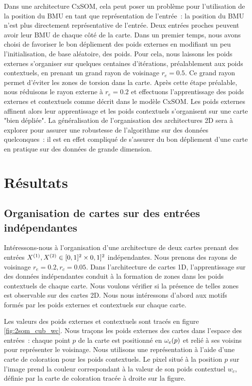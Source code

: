 \documentclass[../main]{subfiles}
\begin{document}
Dans une architecture CxSOM, cela peut poser un problème pour l'utilisation de la position du BMU en tant que représentation de l'entrée~: la position du BMU n'est plus directement représentative de l'entrée.  Deux entrées proches peuvent avoir leur BMU de chaque côté de la carte.
Dans un premier temps, nous avons choisi de favoriser le bon dépliement des poids externes en modifiant un peu l'initialisation, de base aléatoire, des poids. Pour cela, nous laissons les poids externes s'organiser sur quelques centaines d'itérations, préalablement aux poids contextuels, en prenant un grand rayon de voisinage $r_e = 0.5$. 
Ce grand rayon permet d'éviter les zones de torsion dans la carte. Après cette étape préalable, nous réduisons le rayon externe  à $r_e = 0.2$ et effectuons l'apprentissage des poids externes et contextuels comme décrit dans le modèle CxSOM. Les poids externes affinent alors leur apprentissage et les poids contextuels s'organisent sur une carte "bien dépliée". 
La généralisation de l'organisation des architectures 2D sera à explorer pour assurer une robustesse de l'algorithme sur des données quelconques~: il est en effet compliqué de s'assurer du bon dépliement d'une carte en pratique sur des données de grande dimension.


\section{Résultats}


\subsection{Organisation de cartes sur des entrées indépendantes}

Intéressons-nous à l'organisation d'une architecture de deux cartes prenant des entrées $X^{({1})}, X^{({2})} \in [0,1]^2 \times 0,1]^2$ indépendantes. Nous prenons des rayons de voisinage $r_e = 0.2, r_c = 0.05$.
Dans l'architecture de cartes 1D, l'apprentissage sur des données indépendantes conduit à la formation de zones dans les poids contextuels de chaque carte. Nous voulons vérifier si la présence de telles zones est observable sur des cartes 2D.
Nous nous intéressons d'abord aux motifs formés par les poids externes et contextuels sur chaque carte.

Les valeurs des poids externes et contextuels sont tracés en figure \ref{fig:2som_cub_wc}.
Nous traçons les poids externes des cartes dans l'espace des entrées~: chaque point $p$ de la carte est positionné en $\omega_e(p)$ et relié à ses voisins pour représenter le voisinage.
Nous utilisons une représentation à l'aide d'une carte de coloration pour les poids contextuels. Le pixel situé à la position $p$ sur l'image prend la couleur correspondant à la valeur de son poids contextuel $w_c$, définie par la carte de coloration tracée à droite sur la figure.
\end{document}
